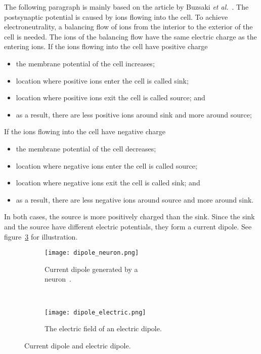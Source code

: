 The following paragraph is mainly based on the article by Buzsaki \textit{et al.}~\cite{electric_field}. The \gls{postsynaptic potential} is caused by ions flowing into the cell. To achieve electroneutrality, a balancing flow of ions from the interior to the exterior of the cell is needed. The ions of the balancing flow have the same electric charge as the entering ions. If the ions flowing into the cell have positive charge
\begin{itemize}
	\item the \gls{membrane potential} of the cell increases;
	\item location where positive ions enter the cell is called \gls{sink};
	\item location where positive ions exit the cell is called \gls{source}; and
	\item as a result, there are less positive ions around \gls{sink} and more around \gls{source};
\end{itemize}
If the ions flowing into the cell have negative charge
\begin{itemize}
	\item the \gls{membrane potential} of the cell decreases;
	\item location where negative ions enter the cell is called \gls{source};
	\item location where negative ions exit the cell is called \gls{sink}; and
	\item as a result, there are less negative ions around \gls{source} and more around \gls{sink}.
\end{itemize}

In both cases, the \gls{source} is more positively charged than the \gls{sink}. Since the \gls{sink} and the \gls{source} have different electric potentials, they form a \gls{current dipole}. See figure~\ref{fig:dipole} for illustration.

\begin{figure}[h!]
	\centering
	\begin{subfigure}{0.48\textwidth}
		\texttt{[image: dipole\_neuron.png]}
		\caption{Current dipole generated by a \\neuron~\cite[p.~669]{neuroscience}.}
		\label{fig:dipole_neuron}
	\end{subfigure}
	~
	\begin{subfigure}{0.48\textwidth}
		\texttt{[image: dipole\_electric.png]}
		\caption{The electric field of an electric dipole\protect\footnotemark.}
		\label{fig:dipole_electric}
	\end{subfigure}
	\caption{Current dipole and electric dipole.}
	\label{fig:dipole}
\end{figure}

